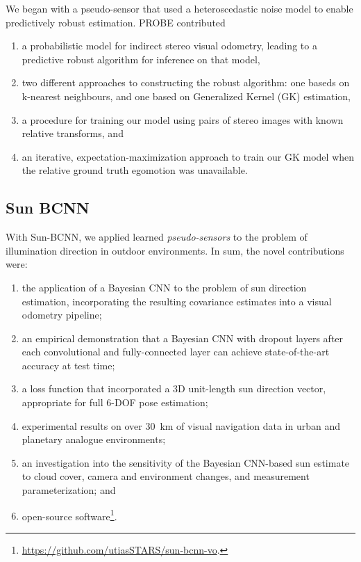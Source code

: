 We began with a pseudo-sensor that used a heteroscedastic noise model to enable predictively robust estimation. PROBE contributed
\begin{enumerate}
\item a probabilistic model for indirect stereo visual odometry, leading to a predictive robust algorithm for inference on that model,
\item two different approaches to constructing the robust algorithm: one baseds on k-nearest neighbours, and one based on Generalized Kernel (GK) estimation,
\item a procedure for training our model using pairs of stereo images with known relative transforms, and
\item an iterative, expectation-maximization approach to train our GK model when the relative ground truth egomotion was unavailable.
\end{enumerate}



\subsection{Sun BCNN}




With Sun-BCNN, we applied learned \textit{pseudo-sensors} to the problem of illumination direction in outdoor environments. In sum, the novel contributions were:
\begin{enumerate}
\item the application of a Bayesian CNN to the problem of sun direction estimation, incorporating the resulting covariance estimates into a visual odometry pipeline; 
\item an empirical demonstration that a Bayesian CNN with dropout layers after each convolutional and fully-connected layer can achieve state-of-the-art accuracy at test time;
\item a loss function that incorporated a 3D unit-length sun direction vector, appropriate for full 6-DOF pose estimation;
\item experimental results on over 30~km of visual navigation data in urban \citep{Geiger2013-ky} and planetary analogue \citep{Furgale2012-kk} environments; 
\item an investigation into the sensitivity of the Bayesian CNN-based sun estimate to cloud cover, camera and environment changes, and measurement parameterization; and
\item open-source software\footnote{\url{https://github.com/utiasSTARS/sun-bcnn-vo}.}.
\end{enumerate}

